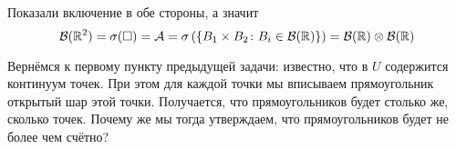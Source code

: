 \begin{problem}
    Показали включение в обе стороны, а значит
    \[
        \mathcal{B}(\mathbb{R}^2) = \sigma(\Box) = \mathcal{A} =
        \sigma\left( \left\{ B_1 \times B_2 \colon B_i \in \mathcal{B}(\mathbb{R}) \right\} \right)
        = \mathcal{B}(\mathbb{R}) \otimes \mathcal{B}(\mathbb{R})
    \]
\end{problem}
\begin{exercise}
    Вернёмся к первому пункту предыдущей задачи: известно, что в $U$ содержится континуум точек.
    При этом для каждой точки мы вписываем прямоугольник открытый шар этой точки. Получается,
    что прямоугольников будет столько же, сколько точек. Почему же мы тогда утверждаем,
    что прямоугольников будет не более чем счётно?
\end{exercise}